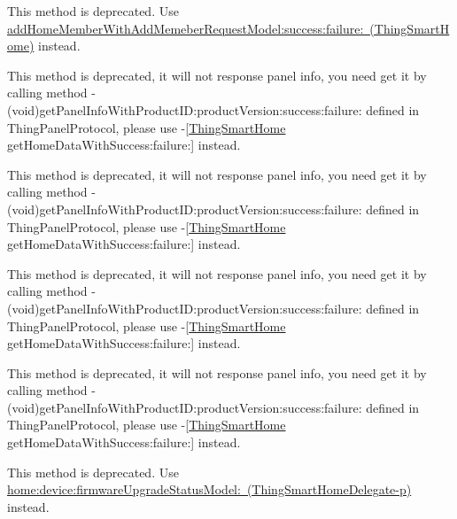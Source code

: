 \begin{DoxyRefList}
\label{deprecated__deprecated000062}%
%
This method is deprecated. Use \mbox{\hyperlink{interface_thing_smart_home_a67a1c33e2358715a749881ff8a791843}{add\+Home\+Member\+With\+Add\+Memeber\+Request\+Model\+:success\+:failure\+: (\+Thing\+Smart\+Home)}} instead.  
\item[(Thing\+Deprecated\+Api) Member \mbox{\hyperlink{category_thing_smart_home_07_thing_deprecated_api_08_a0e4c645300d029a63566d2db676a22ca}{\mbox{[}Thing\+Smart\+Home(Thing\+Deprecated\+Api) get\+Home\+Detail\+With\+Success\+:failure\+:\mbox{]}}} ]\label{deprecated__deprecated000006}%
%
This method is deprecated, it will not response panel info, you need get it by calling method {\ttfamily -\/ (void)get\+Panel\+Info\+With\+Product\+ID\+:product\+Version\+:success\+:failure\+:} defined in Thing\+Panel\+Protocol, please use -\/\mbox{[}\mbox{\hyperlink{interface_thing_smart_home}{Thing\+Smart\+Home}} get\+Home\+Data\+With\+Success\+:failure\+:\mbox{]} instead. 

\label{deprecated__deprecated000060}%
%
This method is deprecated, it will not response panel info, you need get it by calling method {\ttfamily -\/ (void)get\+Panel\+Info\+With\+Product\+ID\+:product\+Version\+:success\+:failure\+:} defined in Thing\+Panel\+Protocol, please use -\/\mbox{[}\mbox{\hyperlink{interface_thing_smart_home}{Thing\+Smart\+Home}} get\+Home\+Data\+With\+Success\+:failure\+:\mbox{]} instead. 

\label{deprecated__deprecated000024}%
%
This method is deprecated, it will not response panel info, you need get it by calling method {\ttfamily -\/ (void)get\+Panel\+Info\+With\+Product\+ID\+:product\+Version\+:success\+:failure\+:} defined in Thing\+Panel\+Protocol, please use -\/\mbox{[}\mbox{\hyperlink{interface_thing_smart_home}{Thing\+Smart\+Home}} get\+Home\+Data\+With\+Success\+:failure\+:\mbox{]} instead. 

\label{deprecated__deprecated000042}%
%
This method is deprecated, it will not response panel info, you need get it by calling method {\ttfamily -\/ (void)get\+Panel\+Info\+With\+Product\+ID\+:product\+Version\+:success\+:failure\+:} defined in Thing\+Panel\+Protocol, please use -\/\mbox{[}\mbox{\hyperlink{interface_thing_smart_home}{Thing\+Smart\+Home}} get\+Home\+Data\+With\+Success\+:failure\+:\mbox{]} instead.  
\item[Member \mbox{\hyperlink{protocol_thing_smart_home_delegate-p_a3f130fcfc2d9f91554cd4ab522f206a5}{\mbox{[}Thing\+Smart\+Home\+Delegate-\/p home\+:device\+:upgrade\+Status\+:\mbox{]}}} ]\label{deprecated__deprecated000020}%
%
This method is deprecated. Use \mbox{\hyperlink{protocol_thing_smart_home_delegate-p_ac784dc7612e4ae3881f7f0f28b75fa04}{home\+:device\+:firmware\+Upgrade\+Status\+Model\+: (\+Thing\+Smart\+Home\+Delegate-\/p)}} instead. 


\end{DoxyRefList}
